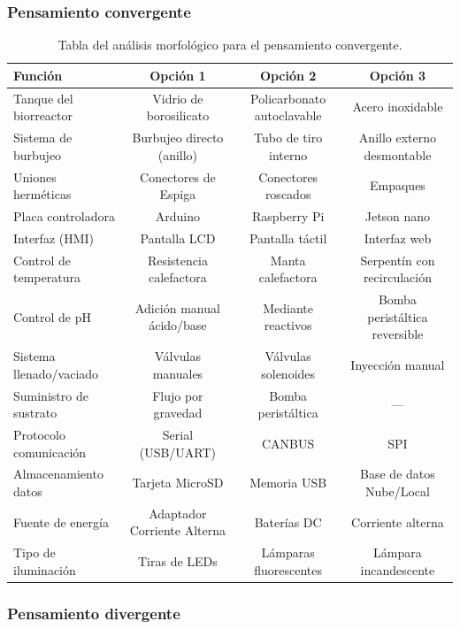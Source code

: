 \documentclass[11pt,tesis,twoside,openright,spanish]{upiiztt}
\begin{document}
\subsubsection{Pensamiento convergente}

\begin{table}[H]
\centering
\caption{Tabla del análisis morfológico para el pensamiento convergente.}
\label{tab:morfologico}
\small
\begin{tabular}{lccc}
\toprule
\textbf{Función} & \textbf{Opción 1} & \textbf{Opción 2} & \textbf{Opción 3} \\
\midrule
Tanque del biorreactor & Vidrio de borosilicato & Policarbonato autoclavable & Acero inoxidable \\
Sistema de burbujeo & Burbujeo directo (anillo) & Tubo de tiro interno & Anillo externo desmontable \\
Uniones herméticas & Conectores de Espiga & Conectores roscados & Empaques \\
Placa controladora & Arduino & Raspberry Pi & Jetson nano \\
Interfaz (HMI) & Pantalla LCD & Pantalla táctil & Interfaz web \\
Control de temperatura & Resistencia calefactora & Manta calefactora & Serpentín con recirculación \\
Control de pH & Adición manual ácido/base & Mediante reactivos & Bomba peristáltica reversible \\
Sistema llenado/vaciado & Válvulas manuales & Válvulas solenoides & Inyección manual \\
Suministro de sustrato & Flujo por gravedad & Bomba peristáltica & --- \\
Protocolo comunicación & Serial (USB/UART) & CANBUS & SPI \\
Almacenamiento datos & Tarjeta MicroSD & Memoria USB & Base de datos Nube/Local \\
Fuente de energía & Adaptador Corriente Alterna & Baterías DC & Corriente alterna \\
Tipo de iluminación & Tiras de LEDs & Lámparas fluorescentes & Lámpara incandescente \\
\bottomrule
\end{tabular}
\end{table}

\subsubsection{Pensamiento divergente}
\end{document}
